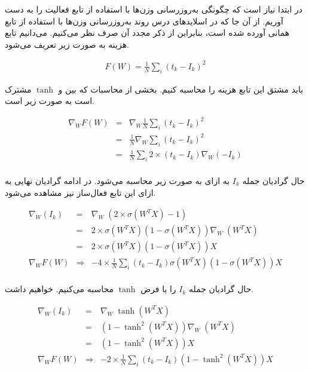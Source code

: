\documentclass[12pt, a4paper]{article}
\begin{document}
در ابتدا نیاز است که چگونگی به‌روزرسانی وزن‌ها با استفاده از تابع فعالیت را به دست آوریم. از آن جا که
در اسلاید‌های درس روند به‌روزرسانی وزن‌ها با استفاده از تابع همانی آورده شده است، بنابراین از ذکر
مجدد آن صرف نظر می‌کنیم. می‌دانیم تابع هزینه به صورت زیر تعریف می‌شود.

\begin{eqnarray*}
    F(W) = \frac{1}{N} \sum_{i} (t_k - I_k)^2
\end{eqnarray*}

باید مشتق این تابع هزینه را محاسبه کنیم. بخشی از محاسبات که بین  و $\tanh$ مشترک است
به صورت زیر است.

\begin{eqnarray*}
    \nabla_W F(W) & = & \nabla_W \frac{1}{N} \sum_{i} (t_k - I_k)^2 \\
    & = & \frac{1}{N} \nabla_W \sum_{i} (t_k - I_k)^2 \\
    & = & \frac{1}{N} \sum_{i} 2 \times (t_k - I_k) \nabla_W (-I_k) \\
\end{eqnarray*}

حال گرادیان جمله $I_k$ به ازای  به صورت زیر محاسبه می‌شود.
در ادامه گرادیان نهایی به ازای این تابع فعال‌ساز نیز مشاهده می‌شود.

\begin{eqnarray*}
    \nabla_W (I_k) & = & \nabla_W \; (2 \times \sigma(W^TX)-1)\\
    & = & 2 \times \sigma(W^TX) (1-\sigma(W^TX)) \nabla_W \; (W^TX) \\
    & = & 2 \times \sigma(W^TX) (1-\sigma(W^TX)) X \\
    \nabla_W F(W) & \Longrightarrow & -4 \times \frac{1}{N} \sum_{i} (t_k - I_k) \sigma(W^TX) (1-\sigma(W^TX)) X \\
\end{eqnarray*}

حال گرادیان جمله $I_k$ را با فرض $\tanh$ محاسبه می‌کنیم. خواهیم داشت.

\begin{eqnarray*}
    \nabla_W (I_k) & = & \nabla_W \; \tanh(W^TX)\\
    & = & (1-\tanh^2(W^TX)) \nabla_W \; (W^TX) \\
    & = & (1-\tanh^2(W^TX)) X \\
    \nabla_W F(W) & \Longrightarrow & -2 \times \frac{1}{N} \sum_{i} (t_k - I_k) (1-\tanh^2(W^TX)) X \\
\end{eqnarray*}
\end{document}
